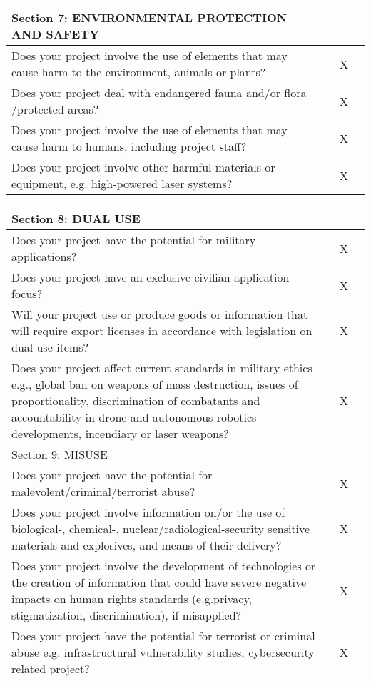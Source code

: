 \begin{tabular}{|p{350pt}|l|c|c|}
    \hline
    Section 7: ENVIRONMENTAL PROTECTION AND SAFETY &&\\
    \hline
    Does your project involve the use of elements that may cause harm to the environment, animals or plants? &&X\\
    \hline
    Does your project deal with endangered fauna and/or flora /protected areas? &&X\\
    \hline
    Does your project involve the use of elements that may cause harm to humans, including project staff? &&X\\
    \hline
    Does your project involve other harmful materials or equipment, e.g. high-powered laser systems? &&X\\
    \hline
\end{tabular}

\centering
\begin{tabular}{|p{350pt}|l|c|c|}
    \hline 
    Section 8: DUAL USE &&\\
    \hline
    Does your project have the potential for military applications? &&X\\
    \hline
    Does your project have an exclusive civilian application focus? &&X\\
    \hline
    Will your project use or produce goods or information that will require export licenses in accordance with legislation on dual use items? &&X\\
    \hline
    Does your project affect current standards in military ethics e.g., global ban on weapons of mass destruction, issues of proportionality, discrimination of combatants and accountability in drone and autonomous robotics developments, incendiary or laser weapons? &&X\\
    \hline
    Section 9: MISUSE &&\\
    \hline
    Does your project have the potential for malevolent/criminal/terrorist abuse? &&X\\
    \hline
    Does your project involve information on/or the use of biological-, chemical-, nuclear/radiological-security sensitive materials and explosives, and means of their delivery? &&X\\
    \hline
    Does your project involve the development of technologies or the creation of information that could have severe negative impacts on human rights standards (e.g.privacy, stigmatization, discrimination), if misapplied? &&X\\
    \hline
    Does your project have the potential for terrorist or criminal abuse e.g. infrastructural vulnerability studies, cybersecurity related project? &&X\\

\end{tabular}
